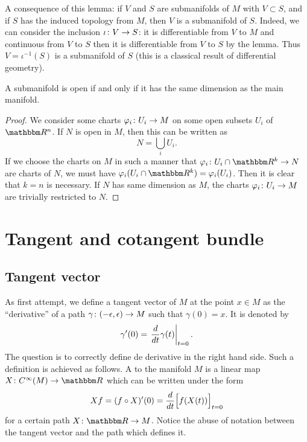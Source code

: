 A consequence of this lemma: if $V$ and $S$ are submanifolds of $M$ with $V\subset S$, and if $S$ has the induced topology from $M$, then $V$ is a submanifold of $S$. Indeed, we can consider the inclusion $\iota\colon V\to S$: it is differentiable from $V$ to $M$ and continuous from $V$ to $S$ then it is differentiable from $V$ to $S$ by the lemma. Thus $V=\iota^{-1}(S)$ is a submanifold of $S$ (this is a classical result of differential geometry).

\begin{proposition}
A submanifold is open if and only if it has the same dimension as the main manifold.
\label{prop:subvar_ouvert}
\end{proposition}

\begin{proof}
We consider some charts $\varphi_i\colon U_i\to M$ on some open subsets $U_i$ of $\eR^n$. If $N$ is open in $M$, then this can be written as 
\[
  N=\bigcup_iU_i.
\]
If we choose the charts on $M$ in such a manner that $\dpt{\varphi_i}{U_i\cap \eR^k}{N}$ are charts of $N$, we must have $\varphi_i(U_i\cap\eR^k)=\varphi_i(U_i)$. Then it is clear that $k=n$ is necessary.
If $N$ has same dimension as $M$, the charts $\varphi_i\colon U_i\to M$ are trivially restricted to $N$.
\end{proof}


\section{Tangent and cotangent bundle}

\subsection{Tangent vector}

As first attempt, we define a tangent vector of $M$ at the point $x\in M$ as the ``derivative'' of a path $\gamma\colon (-\epsilon,\epsilon)\to M$ such that $\gamma(0)=x$. It is denoted by
\[
\gamma'(0)= \left.\frac{d}{dt}\gamma(t)\right|_{t=0}.
\]
The question is to correctly define de derivative in the right hand side. Such a definition is achieved as follows. A  to the manifold $M$ is a linear map $X\colon  C^{\infty}(M)\to \eR$ which can be written under the form
\begin{equation}  \label{eq_deftgpath}
   Xf=(f\circ X)'(0)=\frac{d}{dt}\Big[f(X(t))\Big]_{t=0}
\end{equation}
for a certain path $X\colon \eR\to M$. Notice the abuse of notation between the tangent vector and the path which defines it.

